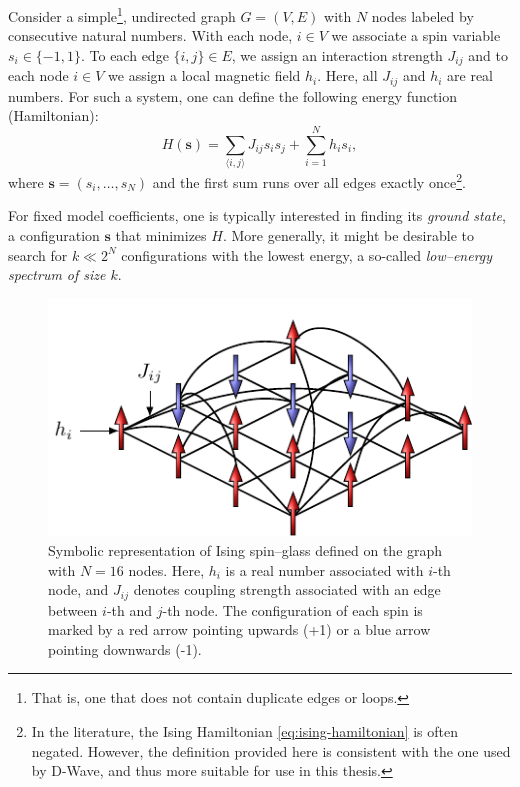Consider a simple\footnote{That is, one that does not contain duplicate edges
  or loops.}, undirected graph $G = (V, E)$ with $N$ nodes labeled by consecutive
natural numbers. With each node, $i \in V$ we associate a spin variable $s_i
  \in \{-1, 1\}$. To each edge $\{i, j\} \in E$, we assign an interaction
    strength $J_{ij}$ and to each node $i \in V$ we assign a local magnetic field
  $h_i$. Here, all $J_{ij}$ and $h_i$ are real numbers. For such a system, one
    can define the following energy function (Hamiltonian):
    \begin{equation}
      \label{eq:ising-hamiltonian}
      H(\mathbf{s}) = \sum_{\langle i, j \rangle} J_{ij} s_i s_j +  \sum_{i=1}^N h_i s_i,
    \end{equation}
    where $\mathbf{s} = (s_i, \ldots, s_N)$ and the first sum runs over all edges
exactly once\footnote{ In the literature, the Ising Hamiltonian
  \eqref{eq:ising-hamiltonian} is often negated. However, the definition provided
  here is consistent with the one used by D-Wave, and thus more suitable for use
  in this thesis.}.

For fixed model coefficients, one is typically interested in finding its
\emph{ground state}, a configuration $\mathbf{s}$ that minimizes $H$. More
    generally, it might be desirable to search for $k \ll 2^N$ configurations with
the lowest energy, a so-called \emph{low--energy spectrum of size $k$}.

\begin{figure}[H]
  \centering
  \includegraphics{figures/spins.pdf}
  \caption{Symbolic representation of Ising spin--glass defined on the graph with $N=16$
    nodes. Here, $h_i$ is a real number associated with $i$-th node, and $J_{ij}$
        denotes coupling strength associated with an edge between $i$-th and $j$-th
    node. The configuration of each spin is marked by a red arrow pointing upwards
    (+1) or a blue arrow pointing downwards (-1).} \label{fig:my_label}
\end{figure}

